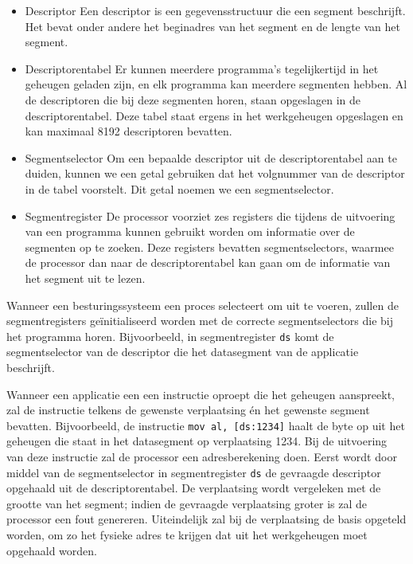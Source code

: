 \begin{itemize}
\item{Descriptor} Een descriptor is een gegevensstructuur die
een segment beschrijft. Het bevat onder andere het beginadres van het segment en
de lengte van het segment.
\item{Descriptorentabel} Er kunnen meerdere
programma's tegelijkertijd in het geheugen geladen zijn, en elk programma kan
meerdere segmenten hebben. Al de descriptoren die bij deze segmenten horen,
staan opgeslagen in de descriptorentabel. Deze tabel staat ergens in het
werkgeheugen opgeslagen en kan maximaal 8192 descriptoren bevatten.
\item{Segmentselector} Om een bepaalde descriptor uit de descriptorentabel aan
te duiden, kunnen we een getal gebruiken dat het volgnummer van de descriptor in
de tabel voorstelt. Dit getal noemen we een segmentselector.
\item{Segmentregister} De processor voorziet zes registers die tijdens de
uitvoering van een programma kunnen gebruikt worden om informatie over de
segmenten op te zoeken. Deze registers bevatten segmentselectors, waarmee de
processor dan naar de descriptorentabel kan gaan om de informatie van het
segment uit te lezen.
\end{itemize}

Wanneer een besturingssysteem een proces selecteert om uit te voeren, zullen de
segmentregisters ge\"initialiseerd worden met de correcte segmentselectors die
bij het programma horen. Bijvoorbeeld, in segmentregister \texttt{ds} komt de segmentselector
van de descriptor die het datasegment van de applicatie beschrijft.

Wanneer een applicatie een een instructie oproept die het geheugen aanspreekt, zal de instructie telkens de gewenste verplaatsing \'en het gewenste segment bevatten. Bijvoorbeeld, de instructie \texttt{mov al, [ds:1234]} haalt de byte op uit het geheugen die staat in het datasegment op verplaatsing 1234. Bij de uitvoering van deze instructie zal de processor een adresberekening doen. Eerst wordt door middel van de segmentselector in segmentregister \texttt{ds} de gevraagde descriptor opgehaald uit de descriptorentabel. De verplaatsing wordt vergeleken met de grootte van het segment; indien de gevraagde verplaatsing groter is zal de processor een fout genereren. Uiteindelijk zal bij de verplaatsing de basis opgeteld worden, om zo het fysieke adres te krijgen dat uit het werkgeheugen moet opgehaald worden.


